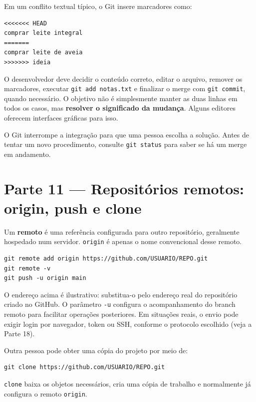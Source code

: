 \documentclass[11pt,a4paper]{article}
\begin{document}
Em um conflito textual típico, o Git insere marcadores como:
\begin{lstlisting}
<<<<<<< HEAD
comprar leite integral
=======
comprar leite de aveia
>>>>>>> ideia
\end{lstlisting}
O desenvolvedor deve decidir o conteúdo correto, editar o arquivo, remover os marcadores, executar \texttt{git add notas.txt} e finalizar o merge com \texttt{git commit}, quando necessário. O objetivo não é simplesmente manter as duas linhas em todos os casos, mas \textbf{resolver o significado da mudança}. Alguns editores oferecem interfaces gráficas para isso.

\begin{tcolorbox}[alertbox,title={CONFLITO NÃO SIGNIFICA PERDA AUTOMÁTICA DE TRABALHO}]
O Git interrompe a integração para que uma pessoa escolha a solução. Antes de tentar um novo procedimento, consulte \texttt{git status} para saber se há um merge em andamento.
\end{tcolorbox}

\section*{Parte 11 --- Repositórios remotos: origin, push e clone}
Um \textbf{remoto} é uma referência configurada para outro repositório, geralmente hospedado num servidor. \texttt{origin} é apenas o nome convencional desse remoto.
\begin{lstlisting}
git remote add origin https://github.com/USUARIO/REPO.git
git remote -v
git push -u origin main
\end{lstlisting}
O endereço acima é ilustrativo: substitua-o pelo endereço real do repositório criado no GitHub. O parâmetro \texttt{-u} configura o acompanhamento do branch remoto para facilitar operações posteriores. Em situações reais, o envio pode exigir login por navegador, token ou SSH, conforme o protocolo escolhido (veja a Parte 18).

Outra pessoa pode obter uma cópia do projeto por meio de:
\begin{lstlisting}
git clone https://github.com/USUARIO/REPO.git
\end{lstlisting}
\texttt{clone} baixa os objetos necessários, cria uma cópia de trabalho e normalmente já configura o remoto \texttt{origin}.
\end{document}
